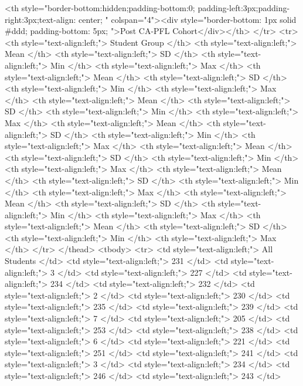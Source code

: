<th style="border-bottom:hidden;padding-bottom:0; padding-left:3px;padding-right:3px;text-align: center; " colspan="4"><div style="border-bottom: 1px solid #ddd; padding-bottom: 5px; ">Post CA-PFL Cohort</div></th>
</tr>
  <tr>
   <th style="text-align:left;"> Student Group </th>
   <th style="text-align:left;"> Mean </th>
   <th style="text-align:left;"> SD </th>
   <th style="text-align:left;"> Min </th>
   <th style="text-align:left;"> Max </th>
   <th style="text-align:left;"> Mean </th>
   <th style="text-align:left;"> SD </th>
   <th style="text-align:left;"> Min </th>
   <th style="text-align:left;"> Max </th>
   <th style="text-align:left;"> Mean </th>
   <th style="text-align:left;"> SD </th>
   <th style="text-align:left;"> Min </th>
   <th style="text-align:left;"> Max </th>
   <th style="text-align:left;"> Mean </th>
   <th style="text-align:left;"> SD </th>
   <th style="text-align:left;"> Min </th>
   <th style="text-align:left;"> Max </th>
   <th style="text-align:left;"> Mean </th>
   <th style="text-align:left;"> SD </th>
   <th style="text-align:left;"> Min </th>
   <th style="text-align:left;"> Max </th>
   <th style="text-align:left;"> Mean </th>
   <th style="text-align:left;"> SD </th>
   <th style="text-align:left;"> Min </th>
   <th style="text-align:left;"> Max </th>
   <th style="text-align:left;"> Mean </th>
   <th style="text-align:left;"> SD </th>
   <th style="text-align:left;"> Min </th>
   <th style="text-align:left;"> Max </th>
   <th style="text-align:left;"> Mean </th>
   <th style="text-align:left;"> SD </th>
   <th style="text-align:left;"> Min </th>
   <th style="text-align:left;"> Max </th>
  </tr>
 </thead>
<tbody>
  <tr>
   <td style="text-align:left;"> All Students </td>
   <td style="text-align:left;"> 231 </td>
   <td style="text-align:left;"> 3 </td>
   <td style="text-align:left;"> 227 </td>
   <td style="text-align:left;"> 234 </td>
   <td style="text-align:left;"> 232 </td>
   <td style="text-align:left;"> 2 </td>
   <td style="text-align:left;"> 230 </td>
   <td style="text-align:left;"> 235 </td>
   <td style="text-align:left;"> 239 </td>
   <td style="text-align:left;"> 7 </td>
   <td style="text-align:left;"> 205 </td>
   <td style="text-align:left;"> 253 </td>
   <td style="text-align:left;"> 238 </td>
   <td style="text-align:left;"> 6 </td>
   <td style="text-align:left;"> 221 </td>
   <td style="text-align:left;"> 251 </td>
   <td style="text-align:left;"> 241 </td>
   <td style="text-align:left;"> 3 </td>
   <td style="text-align:left;"> 234 </td>
   <td style="text-align:left;"> 246 </td>
   <td style="text-align:left;"> 243 </td>
